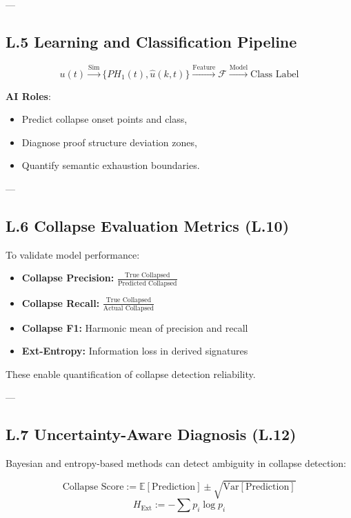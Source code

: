 \documentclass[11pt]{article}
\begin{document}
\begin{axiom}
\begin{axiom}
{---

\subsection*{L.5 Learning and Classification Pipeline}

\[
u(t) \xrightarrow{\text{Sim}} \{ PH_1(t), \widehat{u}(k,t) \} \xrightarrow{\text{Feature}} \mathcal{F} \xrightarrow{\text{Model}} \text{Class Label}
\]

\textbf{AI Roles}:
\begin{itemize}
  \item Predict collapse onset points and class,
  \item Diagnose proof structure deviation zones,
  \item Quantify semantic exhaustion boundaries.
\end{itemize}

---

\subsection*{L.6 Collapse Evaluation Metrics (L.10)}

To validate model performance:

\begin{itemize}
  \item \textbf{Collapse Precision:} $\frac{\text{True Collapsed}}{\text{Predicted Collapsed}}$
  \item \textbf{Collapse Recall:} $\frac{\text{True Collapsed}}{\text{Actual Collapsed}}$
  \item \textbf{Collapse F1:} Harmonic mean of precision and recall
  \item \textbf{Ext-Entropy:} Information loss in derived signatures
\end{itemize}

These enable quantification of collapse detection reliability.

---

\subsection*{L.7 Uncertainty-Aware Diagnosis (L.12)}

Bayesian and entropy-based methods can detect ambiguity in collapse detection:

\[
\text{Collapse Score} := \mathbb{E}[\text{Prediction}] \pm \sqrt{\text{Var}[\text{Prediction}]}
\]
\[
H_{\text{Ext}} := -\sum p_i \log p_i
\]

}
\end{axiom}
\end{axiom}
\end{document}
